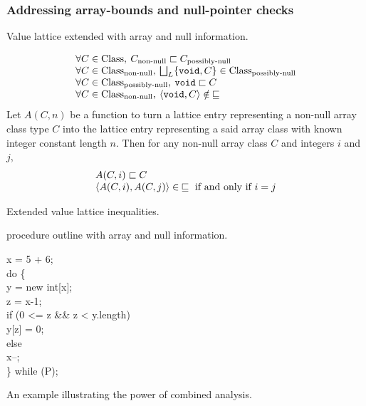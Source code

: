 \documentclass[12pt,titlepage,twoside]{article}
\newcommand*{\figscale}{1.0}
\newcommand{\latlt}{\ensuremath{\sqsubset}}
\newcommand{\latleq}{\ensuremath{\sqsubseteq}}
\begin{document}
\subsubsection{Addressing array-bounds and null-pointer checks}
\begin{myfigure}
\centering\renewcommand*{\figscale}{0.5}
\caption{Value lattice extended with array and null information.}
\label{fig:scclat5}
\end{myfigure}
\begin{myfigure}
\[\begin{array}{l}
\forall C \in \text{Class},\:
  C_{\text{non-null}} \latlt C_{\text{possibly-null}}\\
\forall C \in \text{Class}_{\text{non-null}},\:
  \bigsqcup_L \{\code{void},C\} \in \text{Class}_{\text{possibly-null}}\\
\forall C \in \text{Class}_{\text{possibly-null}},\:
  \code{void} \latlt C\\
\forall C \in \text{Class}_{\text{non-null}},\:
  \tuple{\code{void},C}\notin\:\latleq\\
\end{array}\]%
Let $A(C, n)$ be a
function to turn a lattice entry representing a non-null array class
type $C$ into the lattice entry representing a said array class with
known integer constant length $n$.  Then for any non-null array class
$C$ and integers $i$ and $j$,
\[\begin{array}{l}
A(C, i) \latlt C\\
\tuple{A(C, i), A(C, j)} \in\:\latleq \text{ if and only if } i=j\\
\end{array}\]%
\caption{Extended value lattice inequalities.}\label{fig:arraynull_rules}
\end{myfigure}
\begin{myalgorithm}\small

\caption{ procedure outline with array and null information.}
\label{alg:arraynull_scc}
\end{myalgorithm}
\begin{myfigure}
\begin{samplecode}
x = 5 + 6;\\
do \{\\
\>y = new int[x];\\
\>z = x-1;\\
\>if (0 <= z \&\& z < y.length)\\
\>\>y[z] = 0;\\
\>else\\
\>\>x--;\\
\} while (P);\\
\end{samplecode}
\caption{An example illustrating the power of combined analysis.}
\label{fig:combined}
\end{myfigure}
\end{document}
